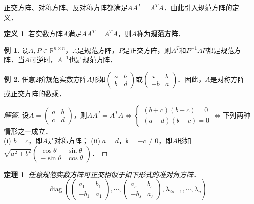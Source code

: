 \documentclass[a4paper,fontset=windows]{ctexbook}
\newtheorem{theorem}{定理}[chapter]
\theoremstyle{definition}
\newtheorem{definition}{定义}[chapter]
\newtheorem{example}{例}[chapter]
\DeclareMathOperator{\diag}{diag}
\begin{document}
正交方阵、对称方阵、反对称方阵都满足$AA^T=A^TA$．由此引入规范方阵的定义．

\begin{definition}
若实数方阵$A$满足$AA^T=A^TA$，则$A$称为{\bf 规范方阵}．
\end{definition}

\begin{example}\label{ex6.5}
设$A,P\in\mathbb{R}^{n\times n}$，$A$是规范方阵，$P$是正交方阵，则$A^T$和$P^{-1}AP$都是规范方阵．当$A$可逆时，$A^{-1}$也是规范方阵．
\end{example}

\begin{example}\label{ex6.6}
任意2阶规范实数方阵$A$形如$\begin{pmatrix}a&b \\ b&d\end{pmatrix}$或$\begin{pmatrix}a&b \\ -b&a\end{pmatrix}$．因此，$A$是对称方阵或正交方阵的数乘．
\end{example}

\begin{proof}[解答]
设$A=\begin{pmatrix}a&b \\ c&d\end{pmatrix}$，则$AA^T=A^TA\Leftrightarrow\begin{cases}(b+c)(b-c)=0 \\ (a-d)(b-c)=0\end{cases}\Leftrightarrow$下列两种情形之一成立．\\
(i) $b=c$，即$A$是对称方阵；
(ii) $a=d$，$b=-c\ne 0$，即$A$形如$\sqrt{a^2+b^2}\begin{pmatrix}\cos\theta&\sin\theta \\ -\sin\theta&\cos\theta\end{pmatrix}$．
\end{proof}

\begin{theorem}\label{thm6.9}
任意规范实数方阵可正交相似于如下形式的准对角方阵．
$$\diag\left(\begin{pmatrix}a_1&b_1 \\ -b_1&a_1\end{pmatrix},\cdots,\begin{pmatrix}a_s&b_s \\ -b_s&a_s\end{pmatrix},\lambda_{2s+1},\cdots,\lambda_n\right)$$
\end{theorem}
\end{document}
